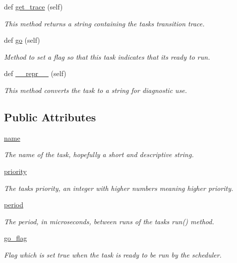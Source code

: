 \begin{DoxyCompactItemize}
def \hyperlink{classcotask_1_1Task_a6e51a228f985aec8c752bd72a73730ae}{get\+\_\+trace} (self)
\begin{DoxyCompactList}\small\item\em This method returns a string containing the task\textquotesingle{}s transition trace. \end{DoxyCompactList}\item 
def \hyperlink{classcotask_1_1Task_a78e74d18a5ba94074c2b5309394409a5}{go} (self)
\begin{DoxyCompactList}\small\item\em Method to set a flag so that this task indicates that it\textquotesingle{}s ready to run. \end{DoxyCompactList}\item 
def \hyperlink{classcotask_1_1Task_a2dcb50b9bf2676dfaac176649bc7d3f9}{\+\_\+\+\_\+repr\+\_\+\+\_\+} (self)
\begin{DoxyCompactList}\small\item\em This method converts the task to a string for diagnostic use. \end{DoxyCompactList}\end{DoxyCompactItemize}
\subsection*{Public Attributes}
\begin{DoxyCompactItemize}
\item 
\hyperlink{classcotask_1_1Task_ab54e069dd0b4f0a2f8e7f00c94998a10}{name}
\begin{DoxyCompactList}\small\item\em The name of the task, hopefully a short and descriptive string. \end{DoxyCompactList}\item 
\hyperlink{classcotask_1_1Task_aeced93c7b7d23e33de9693d278aef88b}{priority}
\begin{DoxyCompactList}\small\item\em The task\textquotesingle{}s priority, an integer with higher numbers meaning higher priority. \end{DoxyCompactList}\item 
\hyperlink{classcotask_1_1Task_a44f980f61f1908764c6821fa886590ca}{period}
\begin{DoxyCompactList}\small\item\em The period, in microseconds, between runs of the task\textquotesingle{}s {\ttfamily run()} method. \end{DoxyCompactList}\item 
\hyperlink{classcotask_1_1Task_a96733bb9f4349a3f284083d1d4e64f9f}{go\+\_\+flag}\hypertarget{classcotask_1_1Task_a96733bb9f4349a3f284083d1d4e64f9f}{}\label{classcotask_1_1Task_a96733bb9f4349a3f284083d1d4e64f9f}

\begin{DoxyCompactList}\small\item\em Flag which is set true when the task is ready to be run by the scheduler. \end{DoxyCompactList}\end{DoxyCompactItemize}


